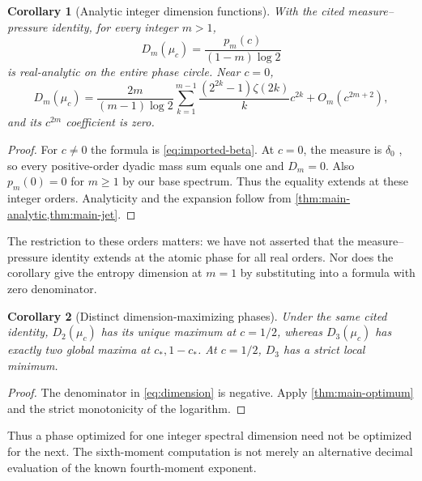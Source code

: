 \documentclass[11pt,a4paper]{article}
\numberwithin{equation}{section}
\newtheorem{corollary}[corollary]{Corollary}
\theoremstyle{definition}
\theoremstyle{remark}
\begin{document}
\begin{corollary}[Analytic integer dimension functions]
\label{cor:dimensions}
With the cited measure--pressure identity, for every integer $m>1$,
\begin{equation}
 D_m(\mu_c)=\frac{p_m(c)}{(1-m)\log2}
 \label{eq:dimension}
\end{equation}
is real-analytic on the entire phase circle. Near $c=0$,
\[
 D_m(\mu_c)=\frac{2m}{(m-1)\log2}
 \sum_{k=1}^{m-1}\frac{(2^{2k}-1)\zeta(2k)}{k}c^{2k}
 +O_m(c^{2m+2}),
\]
and its $c^{2m}$ coefficient is zero.
\end{corollary}
\begin{proof}
For $c\neq0$ the formula is \cref{eq:imported-beta}. At $c=0$, the
measure is $\delta_0$ \cite{GKS}, so every positive-order dyadic mass
sum equals one and $D_m=0$. Also $p_m(0)=0$ for $m\geq1$ by our
base spectrum. Thus the equality extends at these integer orders.
Analyticity and the expansion follow from
\cref{thm:main-analytic,thm:main-jet}.
\end{proof}

The restriction to these orders matters: we have not asserted that the
measure--pressure identity extends at the atomic phase for all real
orders. Nor does the corollary give the entropy dimension at $m=1$ by
substituting into a formula with zero denominator.

\begin{corollary}[Distinct dimension-maximizing phases]
Under the same cited identity, $D_2(\mu_c)$ has its unique maximum
at $c=1/2$, whereas $D_3(\mu_c)$ has exactly two global maxima at
$c_*,1-c_*$. At $c=1/2$, $D_3$ has a strict local minimum.
\end{corollary}
\begin{proof}
The denominator in \cref{eq:dimension} is negative. Apply
\cref{thm:main-optimum} and the strict monotonicity of the logarithm.
\end{proof}

Thus a phase optimized for one integer spectral dimension need not be
optimized for the next. The sixth-moment computation is not merely an
alternative decimal evaluation of the known fourth-moment exponent.
\end{document}
